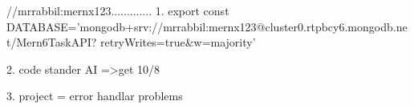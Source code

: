 //mrrabbil:mernx123.............
1. export const DATABASE='mongodb+srv://mrrabbil:mernx123@cluster0.rtpbcy6.mongodb.net/Mern6TaskAPI? retryWrites=true&w=majority'

2. code stander AI =>get 10/8

3. project = error handlar problems